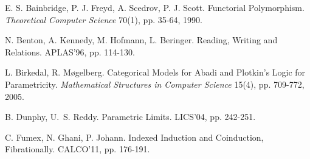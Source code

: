 \documentclass[a4paper,11pt]{article}
\begin{document}
{\begin{thebibliography}{}
\begin{multicols}{2}

E. S. Bainbridge, P. J. Freyd, A. Scedrov, P. J. Scott. Functorial
Polymorphism. {\em Theoretical Computer Science} 70(1), pp. 35-64,
1990. 


 N. Benton, A. Kennedy, M. Hofmann, 
  L. Beringer. Reading, Writing and Relations. APLAS'96,
pp. 114-130. %

L. Birkedal, R. M{\o}gelberg. Categorical Models for Abadi and
Plotkin's Logic for Parametricity. {\em Mathematical Structures in
  Computer Science} 15(4), pp. 709-772, 2005.




B. Dunphy, U.~S. Reddy. Parametric Limits. LICS'04,
pp. 242-251. %


C. Fumex, N. Ghani, P. Johann. Indexed Induction and Coinduction,
Fibrationally. CALCO'11,
pp. 176-191. %



\end{multicols}
\end{thebibliography}}
\end{document}
